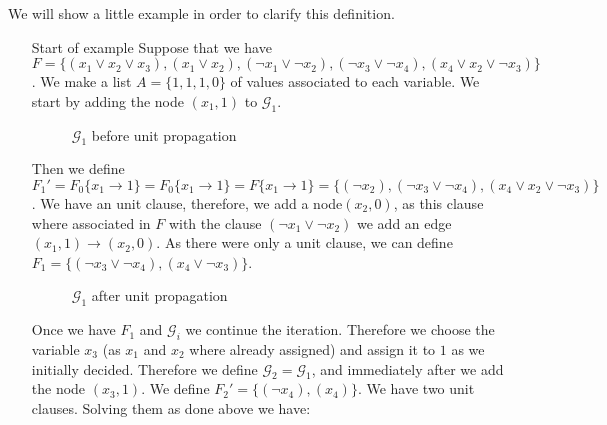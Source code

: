  We will show a little example in order to clarify this definition.
\begin{itemize}
 \item[Start of example] Suppose that we have $F = \{(x_1\vee x_2 \vee x_3), ( x_1 \vee x_2), (\neg x_1 \vee \neg x_2), (\neg x_3 \vee \neg x_4), (x_4 \vee x_2 \vee \neg x_3) \}$. We make a list $A=\{1,1,1,0\}$ of values associated to each variable. We start by adding the node $(x_1,1)$ to $\mathcal{G}_1$. \\


\begin{figure}[H]
  \centering
    \caption{$\mathcal{G}_1$ before unit propagation}
  \end{figure}

  Then we define $F_1' = F_0\{x_1\to 1\} =F_0\{x_1\to 1\} = F\{x_1 \to 1\}= \{(\neg x_2), (\neg x_3 \vee \neg x_4), (x_4 \vee x_2 \vee\neg x_3)\}$. We have an unit clause, therefore, we add a node$(x_2, 0)$, as this clause where associated in $F$ with the clause $(\neg x_1 \vee \neg x_2)$ we add an edge $(x_1,1)\to (x_2,0)$. As there were only a unit clause, we can define $F_1 = \{(\neg x_3 \vee \neg x_4), (x_4 \vee \neg x_3)\}$.\\
  
\begin{figure}[H]
  \centering
  \caption{$\mathcal{G}_1$ after unit propagation}
\end{figure}

Once we have $F_1$ and $\mathcal{G}_i$ we continue the iteration. Therefore we choose the variable $x_3$ (as $x_1$ and $x_2$ where already assigned) and assign it to $1$ as we initially decided. Therefore we define $\mathcal{G}_2 = \mathcal{G}_1 $, and immediately after we add the node $(x_3,1)$. We define $F_2' = \{(\neg x_4), (x_4)\}$. We have two unit clauses. Solving them as done above we have:


\end{itemize}
